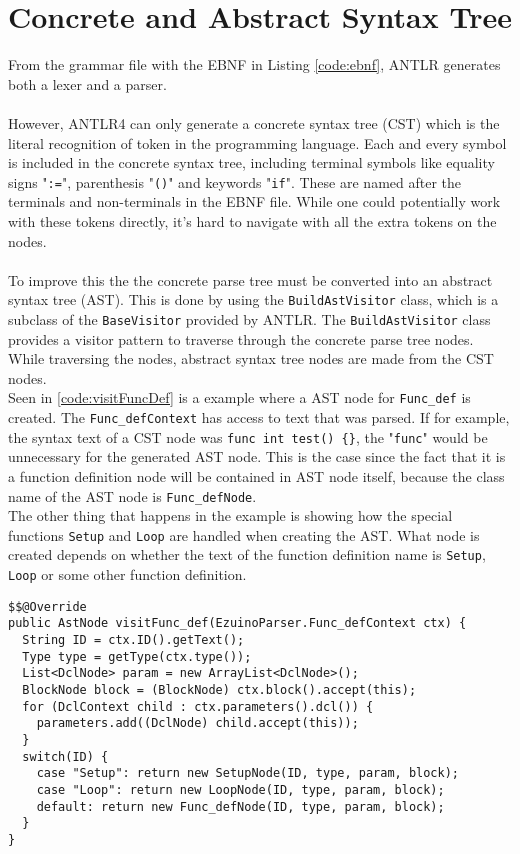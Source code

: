 \section{Concrete and Abstract Syntax Tree}
From the grammar file with the EBNF in Listing \ref{code:ebnf}, ANTLR generates both a lexer and a parser. 
\\\\
However, ANTLR4 can only generate a concrete syntax tree (CST) which is the literal recognition of token in the programming language. Each and every symbol is included in the concrete syntax tree, including terminal symbols like equality signs "\texttt{:=}", parenthesis  "\texttt{()}" and keywords "\texttt{if}". These are named after the terminals and non-terminals in the EBNF file. While one could potentially work with these tokens directly, it's hard to navigate with all the extra tokens on the nodes.
\\\\
To improve this the the concrete parse tree must be converted into an abstract syntax tree (AST). This is done by using the \texttt{BuildAstVisitor} class, which is a subclass of the \texttt{BaseVisitor} provided by ANTLR. The \texttt{BuildAstVisitor} class provides a visitor pattern to traverse through the concrete parse tree nodes. While traversing the nodes, abstract syntax tree nodes are made from the CST nodes.  \\
Seen in \ref{code:visitFuncDef} is a example where a AST node for \texttt{Func\_def} is created. The \texttt{Func\_defContext} has access to text that was parsed. If for example, the syntax text of a CST node was \texttt{func int test() \{\}}, the "\texttt{func}" would be unnecessary for the generated AST node. This is the case since the fact that it is a function definition node will be contained in AST node itself, because the class name of the AST node is \texttt{Func\_defNode}. \\
The other thing that happens in the example is showing how the special functions \texttt{Setup} and \texttt{Loop} are handled when creating the AST. What node is created depends on whether the text of the function definition name is \texttt{Setup}, \texttt{Loop} or some other function definition.
\\
\begin{lstlisting}[caption={Visit method for \texttt{Func\_defContext} in \texttt{AstBuildVisitor}}, label={code:visitFuncDef}]
$$@Override
public AstNode visitFunc_def(EzuinoParser.Func_defContext ctx) {
  String ID = ctx.ID().getText();
  Type type = getType(ctx.type());
  List<DclNode> param = new ArrayList<DclNode>();
  BlockNode block = (BlockNode) ctx.block().accept(this);
  for (DclContext child : ctx.parameters().dcl()) {
    parameters.add((DclNode) child.accept(this));
  }
  switch(ID) {
    case "Setup": return new SetupNode(ID, type, param, block);
    case "Loop": return new LoopNode(ID, type, param, block);
    default: return new Func_defNode(ID, type, param, block);
  }
}
\end{lstlisting}